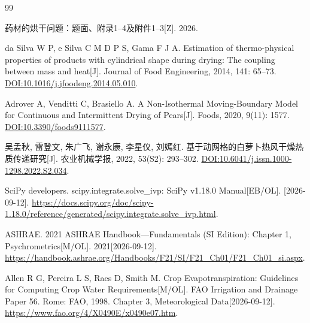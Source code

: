 \begin{thebibliography}{99}
\small
\setlength{\itemsep}{1pt}
\setlength{\parsep}{0pt}
\setlength{\parskip}{0pt}

药材的烘干问题：题面、附录1--4及附件1--3[Z]. 2026.

da Silva W P, e Silva C M D P S, Gama F J A.
Estimation of thermo-physical properties of products with cylindrical shape
during drying: The coupling between mass and heat[J].
Journal of Food Engineering, 2014, 141: 65--73.
\href{https://doi.org/10.1016/j.jfoodeng.2014.05.010}{DOI:10.1016/j.jfoodeng.2014.05.010}.

Adrover A, Venditti C, Brasiello A.
A Non-Isothermal Moving-Boundary Model for Continuous and Intermittent
Drying of Pears[J]. Foods, 2020, 9(11): 1577.
\href{https://doi.org/10.3390/foods9111577}{DOI:10.3390/foods9111577}.

吴孟秋, 雷登文, 朱广飞, 谢永康, 李星仪, 刘嫣红.
基于动网格的白萝卜热风干燥热质传递研究[J].
农业机械学报, 2022, 53(S2): 293--302.
\href{https://doi.org/10.6041/j.issn.1000-1298.2022.S2.034}{DOI:10.6041/j.issn.1000-1298.2022.S2.034}.

SciPy developers.
scipy.integrate.solve\_ivp: SciPy v1.18.0 Manual[EB/OL]. [2026-09-12].
\url{https://docs.scipy.org/doc/scipy-1.18.0/reference/generated/scipy.integrate.solve_ivp.html}.

ASHRAE.
2021 ASHRAE Handbook---Fundamentals (SI Edition):
Chapter 1, Psychrometrics[M/OL]. 2021[2026-09-12].
\url{https://handbook.ashrae.org/Handbooks/F21/SI/F21_Ch01/F21_Ch01_si.aspx}.

Allen R G, Pereira L S, Raes D, Smith M.
Crop Evapotranspiration: Guidelines for Computing Crop Water Requirements[M/OL].
FAO Irrigation and Drainage Paper 56. Rome: FAO, 1998.
Chapter 3, Meteorological Data[2026-09-12].
\url{https://www.fao.org/4/X0490E/x0490e07.htm}.

\end{thebibliography}
